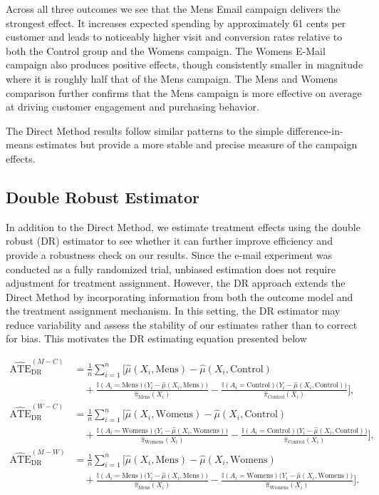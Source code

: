 \documentclass[10pt]{article}
\begin{document}
Across all three outcomes we see that the Mens Email campaign delivers the strongest effect. It increases expected spending by approximately 61 cents per customer and leads to noticeably higher visit and conversion rates relative to both the Control group and the Womens campaign. The Womens E-Mail campaign also produces positive effects, though consistently smaller in magnitude where it is roughly half that of the Mens campaign. The Mens and Womens comparison further confirms that the Mens campaign is more effective on average at driving customer engagement and purchasing behavior.

The Direct Method results follow similar patterns to the simple difference-in-means estimates but provide a more stable and precise measure of the campaign effects. 

\subsection{Double Robust Estimator}

In addition to the Direct Method, we estimate treatment effects using the double robust (DR) estimator to see whether it can further improve efficiency and provide a robustness check on our results. Since the e-mail experiment was conducted as a fully randomized trial, unbiased estimation does not require adjustment for treatment assignment. However, the DR approach extends the Direct Method by incorporating information from both the outcome model and the treatment assignment mechanism. In this setting, the DR estimator may reduce variability and assess the stability of our estimates rather than to correct for bias. This motivates the DR estimating equation presented below

\begin{align*}
\widehat{\text{ATE}}^{(M-C)}_{\text{DR}}
&= \frac{1}{n}\sum_{i=1}^n
\Bigg[
\hat{\mu}(X_i,\text{Mens}) - \hat{\mu}(X_i,\text{Control}) \\
&\quad + \frac{\mathbb{I}(A_i=\text{Mens})\big(Y_i-\hat{\mu}(X_i,\text{Mens})\big)}{\hat{\pi}_{\text{Mens}}(X_i)}
- \frac{\mathbb{I}(A_i=\text{Control})\big(Y_i-\hat{\mu}(X_i,\text{Control})\big)}{\hat{\pi}_{\text{Control}}(X_i)}
\Bigg],
\\[1em]
\widehat{\text{ATE}}^{(W-C)}_{\text{DR}}
&= \frac{1}{n}\sum_{i=1}^n
\Bigg[
\hat{\mu}(X_i,\text{Womens}) - \hat{\mu}(X_i,\text{Control}) \\
&\quad + \frac{\mathbb{I}(A_i=\text{Womens})\big(Y_i-\hat{\mu}(X_i,\text{Womens})\big)}{\hat{\pi}_{\text{Womens}}(X_i)}
- \frac{\mathbb{I}(A_i=\text{Control})\big(Y_i-\hat{\mu}(X_i,\text{Control})\big)}{\hat{\pi}_{\text{Control}}(X_i)}
\Bigg],
\\[1em]
\widehat{\text{ATE}}^{(M-W)}_{\text{DR}}
&= \frac{1}{n}\sum_{i=1}^n
\Bigg[
\hat{\mu}(X_i,\text{Mens}) - \hat{\mu}(X_i,\text{Womens}) \\
&\quad + \frac{\mathbb{I}(A_i=\text{Mens})\big(Y_i-\hat{\mu}(X_i,\text{Mens})\big)}{\hat{\pi}_{\text{Mens}}(X_i)}
- \frac{\mathbb{I}(A_i=\text{Womens})\big(Y_i-\hat{\mu}(X_i,\text{Womens})\big)}{\hat{\pi}_{\text{Womens}}(X_i)}
\Bigg].
\end{align*}
\end{document}
